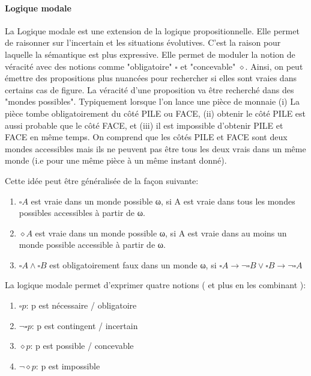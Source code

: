 \begin{refsegment}
    \paragraph{Logique modale}
    La Logique modale est une extension de la logique propositionnelle. Elle permet de raisonner sur l'incertain et les situations évolutives. C’est la raison pour laquelle la sémantique est plus expressive. Elle permet de moduler la notion de véracité avec des notions comme "obligatoire" $\square$ et "concevable" $\diamond$. Ainsi, on peut émettre des propositions plus nuancées pour rechercher si elles sont vraies dans certains cas de figure. La véracité d'une proposition va être recherché dans des "mondes possibles". Typiquement lorsque l'on lance une pièce de monnaie (i) La pièce tombe obligatoirement du côté PILE ou FACE, (ii) obtenir le côté PILE est aussi probable que le côté FACE, et (iii) il est impossible d'obtenir PILE et FACE en même temps. On comprend que les côtés PILE et FACE sont deux mondes accessibles mais ils ne peuvent pas être tous les deux vrais dans un même monde (i.e pour une même pièce à un même instant donné).
    
    Cette idée peut être généralisée de la façon suivante:\nolisttopbreak
    \begin{enumerate}[label=\roman*)]
        \item $\square A$ est vraie dans un monde possible ω, si A est vraie dans tous les mondes possibles accessibles à partir de ω.
        \item $\diamond A$ est vraie dans un monde possible ω, si A est vraie dans au moins un monde possible accessible à partir de ω.
        \item $\square A \land \square B$ est obligatoirement faux dans un monde ω, si $\square A \to \lnot \square B \lor \square B \to \lnot\square A$
    \end{enumerate}

    La logique modale permet d'exprimer quatre notions ( et plus en les combinant ):\nolisttopbreak
    \begin{enumerate}[label={}]
        \item $\square p$: p est nécessaire / obligatoire
        \item $\lnot\square p$: p est contingent / incertain
        \item $\diamond p$: p est possible / concevable
        \item $\lnot \diamond p$: p est impossible
    \end{enumerate}


\end{refsegment}
